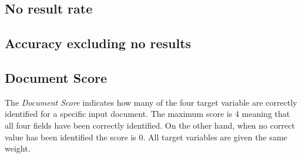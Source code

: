 \subsection{No result rate}
\subsection{Accuracy excluding no results}
\subsection{Document Score}
The \textit{Document Score} indicates how many of the four target variable are correctly identified for a specific input document.
The maximum score is 4 meaning that all four fields have been correctly identified. On the other hand, when no correct value has been identified
the score is 0. All target variables are given the same weight.